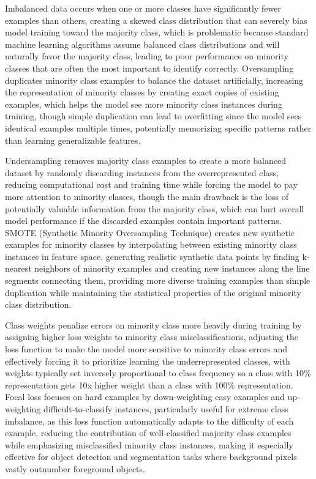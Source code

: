 Imbalanced data occurs when one or more classes have significantly fewer examples than others, creating a skewed class distribution that can severely bias model training toward the majority class, which is problematic because standard machine learning algorithms assume balanced class distributions and will naturally favor the majority class, leading to poor performance on minority classes that are often the most important to identify correctly. Oversampling duplicates minority class examples to balance the dataset artificially, increasing the representation of minority classes by creating exact copies of existing examples, which helps the model see more minority class instances during training, though simple duplication can lead to overfitting since the model sees identical examples multiple times, potentially memorizing specific patterns rather than learning generalizable features.

Undersampling removes majority class examples to create a more balanced dataset by randomly discarding instances from the overrepresented class, reducing computational cost and training time while forcing the model to pay more attention to minority classes, though the main drawback is the loss of potentially valuable information from the majority class, which can hurt overall model performance if the discarded examples contain important patterns. SMOTE (Synthetic Minority Oversampling Technique) creates new synthetic examples for minority classes by interpolating between existing minority class instances in feature space, generating realistic synthetic data points by finding k-nearest neighbors of minority examples and creating new instances along the line segments connecting them, providing more diverse training examples than simple duplication while maintaining the statistical properties of the original minority class distribution.

Class weights penalize errors on minority class more heavily during training by assigning higher loss weights to minority class misclassifications, adjusting the loss function to make the model more sensitive to minority class errors and effectively forcing it to prioritize learning the underrepresented classes, with weights typically set inversely proportional to class frequency so a class with 10\% representation gets 10x higher weight than a class with 100\% representation. Focal loss focuses on hard examples by down-weighting easy examples and up-weighting difficult-to-classify instances, particularly useful for extreme class imbalance, as this loss function automatically adapts to the difficulty of each example, reducing the contribution of well-classified majority class examples while emphasizing misclassified minority class instances, making it especially effective for object detection and segmentation tasks where background pixels vastly outnumber foreground objects.

